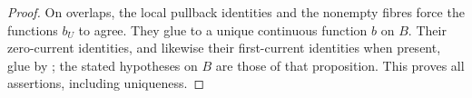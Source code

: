 \begin{proof}
On overlaps, the local pullback identities and the nonempty fibres force
the functions \(b_U\) to agree.  They glue to a unique continuous function
\(b\) on \(B\).  Their zero-current identities, and likewise their
first-current identities when present, glue by
; the stated hypotheses on \(B\) are those
of that proposition.  This proves all assertions, including uniqueness.
\end{proof}

